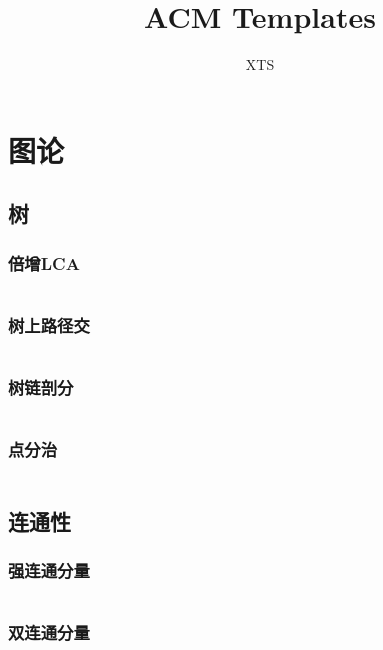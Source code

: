 \documentclass[a4paper,11pt]{article}
\author{XTS}
\title{ACM Templates}
\begin{document}
 
\maketitle 
\newpage
\tableofcontents




\newpage
\section{图论} %

\subsection{树}%

\subsubsection{倍增LCA}%
\inputminted[breaklines]{c++}{Graph/lca.cpp}

\subsubsection{树上路径交}
\inputminted[breaklines]{c++}{Graph/shushanglujingjiao.cpp}

\subsubsection{树链剖分}
\inputminted[breaklines]{c++}{Graph/shulianpofen.cpp}

\subsubsection{点分治}
\inputminted[breaklines]{c++}{Graph/dianfenzhi.cpp}

\subsection{连通性}

\subsubsection{强连通分量}
\inputminted[breaklines]{c++}{Graph/scc.cpp}

\subsubsection{双连通分量}
\inputminted[breaklines]{c++}{Graph/bcc.cpp}
\end{document}
